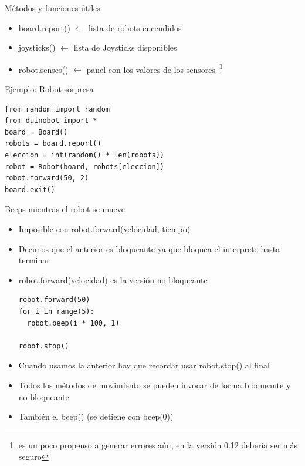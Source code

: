 \documentclass{beamer}[10]
\begin{document}
\begin{frame}[fragile]{Métodos y funciones útiles}
	\begin{itemize}
		\item board.report() $\leftarrow$ lista de robots encendidos
		\item joysticks() $\leftarrow$ lista de Joysticks disponibles
		\item robot.senses() $\leftarrow$ panel con los valores de los sensores~\footnote{es un poco propenso a generar errores aún, en la versión 0.12 debería ser más seguro}
	\end{itemize}\pause
	\begin{block}{Ejemplo: Robot sorpresa}
		\begin{lstlisting}
from random import random
from duinobot import *
board = Board()
robots = board.report()
eleccion = int(random() * len(robots))
robot = Robot(board, robots[eleccion])
robot.forward(50, 2)
board.exit()
		\end{lstlisting}
	\end{block}
\end{frame}
\begin{frame}
	\begin{center}
	\end{center}
\end{frame}
\begin{frame}[fragile]{Beeps mientras el robot se mueve}
	\begin{itemize}[<+->]
		\item Imposible con robot.forward(velocidad, tiempo)
		\item Decimos que el anterior es bloqueante ya que bloquea el interprete hasta terminar
		\item robot.forward(velocidad) es la versión no bloqueante
			\begin{block}{}
				\begin{lstlisting}
robot.forward(50)
for i in range(5):
  robot.beep(i * 100, 1)

robot.stop()
				\end{lstlisting}
			\end{block}
		\item Cuando usamos la anterior hay que recordar usar robot.stop() al final
		\item Todos los métodos de movimiento se pueden invocar de forma bloqueante y no bloqueante
		\item También el beep() (se detiene con beep(0))
	\end{itemize}
\end{frame}
\end{document}
